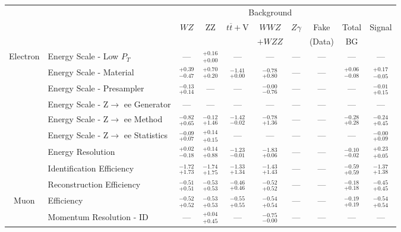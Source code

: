 
\renewcommand{\tabcolsep}{1pt}
\small\begin{tabular}{|cl||cccccc|c||c|}
\hline
 & & \multicolumn{7}{c||}{Background} & \\ 
 & & $WZ$ & ZZ & $t\overline{t}+$V & $WWZ$ & $Z\gamma$ & Fake & Total & Signal\\ 
 & & &  &  & $+WZZ$ &  & (Data) & BG & \\ 
\hline\hline
\multirow{9}{*}{Electron}
&Energy Scale - Low $P_{T}$ & --- &  $^{+0.16}_{+0.00}$  & --- & --- & --- & --- & --- & ---\\ 
\cline{2-10}
&Energy Scale - Material &  $^{+0.39}_{-0.47}$  &  $^{+0.70}_{+0.20}$  &  $^{-1.41}_{+0.00}$  &  $^{-0.78}_{+0.80}$  & --- & --- &  $^{+0.06}_{-0.08}$  &  $^{+0.17}_{-0.05}$ \\ 
\cline{2-10}
&Energy Scale - Presampler &  $^{-0.13}_{+0.14}$  & --- & --- &  $^{-0.00}_{-0.76}$  & --- & --- & --- &  $^{-0.01}_{+0.15}$ \\ 
\cline{2-10}
&Energy Scale - Z$\rightarrow$ ee Generator & --- & --- & --- & --- & --- & --- & --- & ---\\ 
\cline{2-10}
&Energy Scale - Z$\rightarrow$ ee Method &  $^{-0.82}_{+0.65}$  &  $^{-0.12}_{+1.46}$  &  $^{-1.42}_{-0.02}$  &  $^{-0.78}_{+1.36}$  & --- & --- &  $^{-0.28}_{+0.28}$  &  $^{-0.24}_{+0.45}$ \\ 
\cline{2-10}
&Energy Scale - Z$\rightarrow$ ee Statistics &  $^{-0.09}_{+0.07}$  &  $^{+0.14}_{+0.15}$  & --- & --- & --- & --- & --- &  $^{-0.00}_{+0.09}$ \\ 
\cline{2-10}
&Energy Resolution &  $^{+0.02}_{-0.18}$  &  $^{+0.14}_{+0.88}$  &  $^{-1.23}_{-0.01}$  &  $^{-1.83}_{+0.06}$  & --- & --- &  $^{-0.10}_{-0.02}$  &  $^{+0.23}_{+0.05}$ \\ 
\cline{2-10}
&Identification Efficiency &  $^{-1.72}_{+1.73}$  &  $^{-1.74}_{+1.75}$  &  $^{-1.33}_{+1.34}$  &  $^{-1.43}_{+1.43}$  & --- & --- &  $^{-0.59}_{+0.59}$  &  $^{-1.37}_{+1.38}$ \\ 
\cline{2-10}
&Reconstruction Efficiency &  $^{-0.51}_{+0.51}$  &  $^{-0.53}_{+0.53}$  &  $^{-0.46}_{+0.46}$  &  $^{-0.52}_{+0.52}$  & --- & --- &  $^{-0.18}_{+0.18}$  &  $^{-0.45}_{+0.45}$ \\ 
\hline
\multirow{4}{*}{Muon}
&Efficiency &  $^{-0.52}_{+0.52}$  &  $^{-0.53}_{+0.53}$  &  $^{-0.55}_{+0.55}$  &  $^{-0.54}_{+0.54}$  & --- & --- &  $^{-0.19}_{+0.19}$  &  $^{-0.54}_{+0.54}$ \\ 
\cline{2-10}
&Momentum Resolution - ID & --- &  $^{+0.04}_{+0.45}$  & --- &  $^{-0.75}_{-0.00}$  & --- & --- & --- & ---\\ 

\end{tabular}

